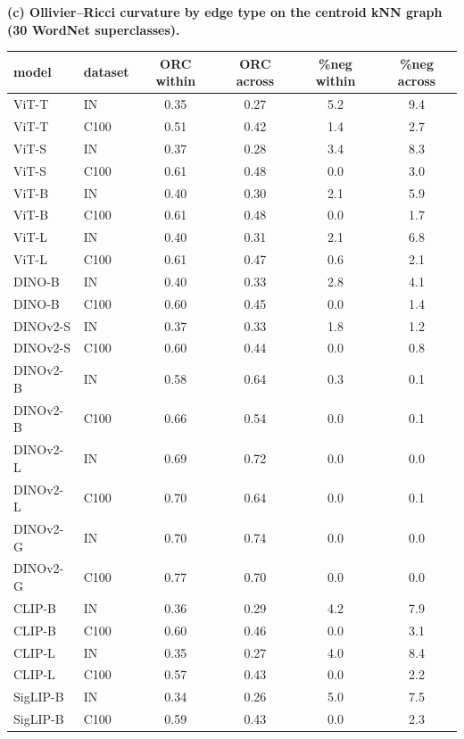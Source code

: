 \begin{table}[H]
\begin{tabular}{lccc}
\bottomrule
\end{tabular}
\par\vspace{5pt}
\noindent\textbf{(c) Ollivier--Ricci curvature by edge type on the centroid kNN graph (30 WordNet superclasses).}\par\vspace{1.5pt}
\begin{tabular}{llcccc}
\toprule
model & dataset & ORC within & ORC across & \%neg within & \%neg across \\
\midrule
ViT-T & IN & 0.35 & 0.27 & 5.2 & 9.4 \\
ViT-T & C100 & 0.51 & 0.42 & 1.4 & 2.7 \\
ViT-S & IN & 0.37 & 0.28 & 3.4 & 8.3 \\
ViT-S & C100 & 0.61 & 0.48 & 0.0 & 3.0 \\
ViT-B & IN & 0.40 & 0.30 & 2.1 & 5.9 \\
ViT-B & C100 & 0.61 & 0.48 & 0.0 & 1.7 \\
ViT-L & IN & 0.40 & 0.31 & 2.1 & 6.8 \\
ViT-L & C100 & 0.61 & 0.47 & 0.6 & 2.1 \\
DINO-B & IN & 0.40 & 0.33 & 2.8 & 4.1 \\
DINO-B & C100 & 0.60 & 0.45 & 0.0 & 1.4 \\
DINOv2-S & IN & 0.37 & 0.33 & 1.8 & 1.2 \\
DINOv2-S & C100 & 0.60 & 0.44 & 0.0 & 0.8 \\
DINOv2-B & IN & 0.58 & 0.64 & 0.3 & 0.1 \\
DINOv2-B & C100 & 0.66 & 0.54 & 0.0 & 0.1 \\
DINOv2-L & IN & 0.69 & 0.72 & 0.0 & 0.0 \\
DINOv2-L & C100 & 0.70 & 0.64 & 0.0 & 0.1 \\
DINOv2-G & IN & 0.70 & 0.74 & 0.0 & 0.0 \\
DINOv2-G & C100 & 0.77 & 0.70 & 0.0 & 0.0 \\
CLIP-B & IN & 0.36 & 0.29 & 4.2 & 7.9 \\
CLIP-B & C100 & 0.60 & 0.46 & 0.0 & 3.1 \\
CLIP-L & IN & 0.35 & 0.27 & 4.0 & 8.4 \\
CLIP-L & C100 & 0.57 & 0.43 & 0.0 & 2.2 \\
SigLIP-B & IN & 0.34 & 0.26 & 5.0 & 7.5 \\
SigLIP-B & C100 & 0.59 & 0.43 & 0.0 & 2.3 \\
\bottomrule
\end{tabular}

\end{table}
